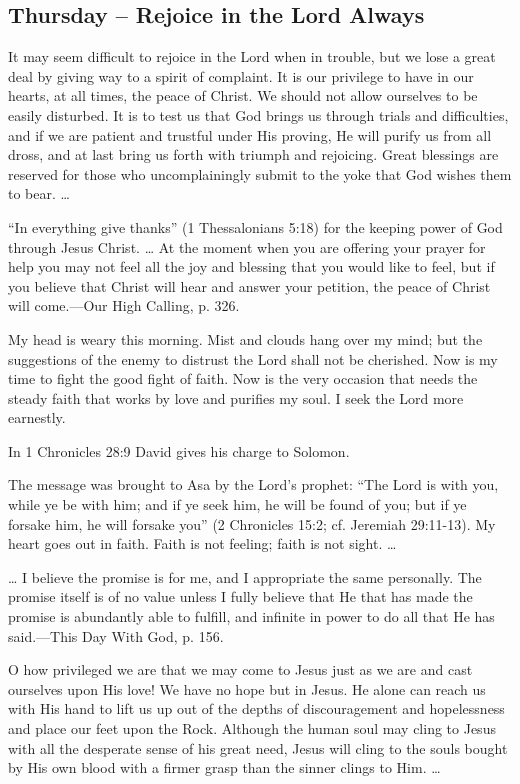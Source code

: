 \documentclass[a4paper, 10pt, twoside, headings=small]{scrartcl}
\begin{document}
\begin{multicols}{2}
\section*{Thursday – Rejoice in the Lord Always}

It may seem difficult to rejoice in the Lord when in trouble, but we lose a great deal by giving way to a spirit of complaint. It is our privilege to have in our hearts, at all times, the peace of Christ. We should not allow ourselves to be easily disturbed. It is to test us that God brings us through trials and difficulties, and if we are patient and trustful under His proving, He will purify us from all dross, and at last bring us forth with triumph and rejoicing. Great blessings are reserved for those who uncomplainingly submit to the yoke that God wishes them to bear. …

“In everything give thanks” (1 Thessalonians 5:18) for the keeping power of God through Jesus Christ. … At the moment when you are offering your prayer for help you may not feel all the joy and blessing that you would like to feel, but if you believe that Christ will hear and answer your petition, the peace of Christ will come.—Our High Calling, p. 326.

My head is weary this morning. Mist and clouds hang over my mind; but the suggestions of the enemy to distrust the Lord shall not be cherished. Now is my time to fight the good fight of faith. Now is the very occasion that needs the steady faith that works by love and purifies my soul. I seek the Lord more earnestly.

In 1 Chronicles 28:9 David gives his charge to Solomon.

The message was brought to Asa by the Lord’s prophet: “The Lord is with you, while ye be with him; and if ye seek him, he will be found of you; but if ye forsake him, he will forsake you” (2 Chronicles 15:2; cf. Jeremiah 29:11-13). My heart goes out in faith. Faith is not feeling; faith is not sight. …

… I believe the promise is for me, and I appropriate the same personally. The promise itself is of no value unless I fully believe that He that has made the promise is abundantly able to fulfill, and infinite in power to do all that He has said.—This Day With God, p. 156.

O how privileged we are that we may come to Jesus just as we are and cast ourselves upon His love! We have no hope but in Jesus. He alone can reach us with His hand to lift us up out of the depths of discouragement and hopelessness and place our feet upon the Rock. Although the human soul may cling to Jesus with all the desperate sense of his great need, Jesus will cling to the souls bought by His own blood with a firmer grasp than the sinner clings to Him. …


\end{multicols}
\end{document}

